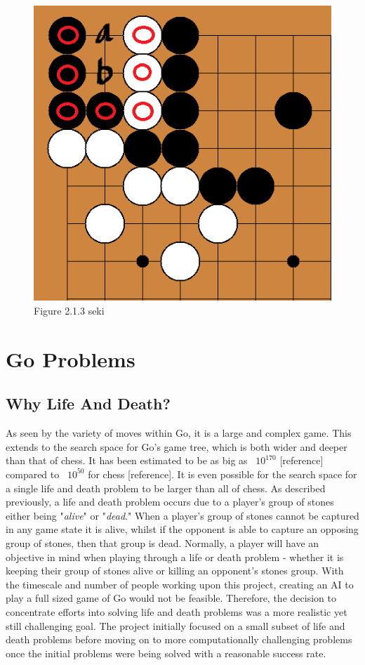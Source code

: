 \documentclass{l3proj}
\begin{document}
\begin{figure}[H]
\centering
\includegraphics[scale=0.5]{Images/seki.png}
\caption{Figure 2.1.3 seki}
\end{figure}

\section{Go Problems}

\subsection{Why Life And Death?}

As seen by the variety of moves within Go, it is a large and complex game. This extends to the search space for Go's game tree, which is both wider and deeper than that of chess. It has been estimated to be as big as ~$10^{170}$ [reference] compared to ~$10^{50}$ for chess [reference]. It is even possible for the search space for a single life and death problem to be larger than all of chess. As described previously, a life and death problem occurs due to a player's group of stones either being "\textit{alive}" or "\textit{dead}." When a player's group of stones cannot be captured in any game state it is alive, whilst if the opponent is able to capture an opposing group of stones, then that group is dead. Normally, a player will have an objective in mind when playing through a life or death problem - whether it is keeping their group of stones alive or killing an opponent's stones group. With the timescale and number of people working upon this project, creating an AI to play a full sized game of Go would not be feasible. Therefore, the decision to concentrate efforts into solving life and death problems was a more realistic yet still challenging goal. The project initially focused on a small subset of life and death problems before moving on to more computationally challenging problems once the initial problems were being solved with a reasonable success rate.
\end{document}

